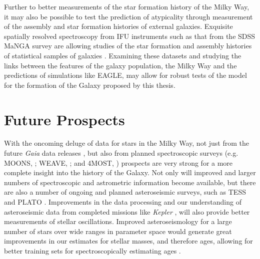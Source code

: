 Further to better measurements of the star formation history of the Milky Way, it may also be possible to test the prediction of atypicality through measurement of the assembly and star formation histories of external galaxies. Exquisite spatially resolved spectroscopy from IFU instruments such as that from the SDSS MaNGA survey \citep[Mapping Nearby Galaxies at Apache Point Observatory;][]{2015ApJ...798....7B} are allowing studies of the star formation and assembly histories of statistical samples of galaxies \citep[e.g.][]{2016MNRAS.463.2799I,2018MNRAS.480.2544R}. Examining these datasets and studying the links between the features of the galaxy population, the Milky Way and the predictions of simulations like EAGLE, may allow for robust tests of the model for the formation of the Galaxy proposed by this thesis.



\section{Future Prospects}
\label{sec:future}
With the oncoming deluge of data for stars in the Milky Way, not just from the future \emph{Gaia} data releases \citep[which will include epoch spectroscopy and photometry, offering the potential to mine the data for element abundances and ages, e.g.][]{2016A&A...595A...1G}, but also from planned spectroscopic surveys (e.g. MOONS, \citeauthor{2012SPIE.8446E..0SC} \citeyear{2012SPIE.8446E..0SC}; WEAVE, \citeauthor{2012SPIE.8446E..0PD} \citeyear{2012SPIE.8446E..0PD}; and 4MOST, \citeauthor{2016SPIE.9908E..1OD} \citeyear{2016SPIE.9908E..1OD}) prospects are very strong for a more complete insight into the history of the Galaxy. Not only will improved and larger numbers of spectroscopic and astrometric information become available, but there are also a number of ongoing and planned asteroseismic surveys, such as TESS \citep{2015JATIS...1a4003R} and PLATO \citep[e.g.][]{2017AN....338..644M}. Improvements in the data processing and our understanding of asteroseismic data from completed missions like \emph{Kepler} \citep{2010Sci...327..977B}, will also provide better measurements of stellar oscillations. Improved asteroseismology for a large number of stars over wide ranges in parameter space would generate great improvements in our estimates for stellar masses, and therefore ages, allowing for better training sets for spectroscopically estimating ages \citep[Such as those in Chapter \ref{chapter:apogeestruc}, from methods like that of e.g.][]{2016MNRAS.456.3655M}. 

